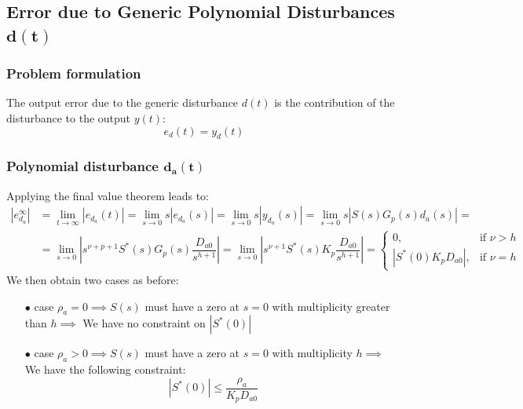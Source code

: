 \documentclass{article}
\numberwithin{equation}{subsection}
\begin{document}
	\subsection{Error due to Generic Polynomial Disturbances $\boldsymbol{d(t)}$}
	\subsubsection{Problem formulation}
	The output error due to the generic disturbance $d(t)$ is the contribution of the disturbance to the output $y(t)$:
	\begin{equation}
		e_d(t) = y_d(t)
	\end{equation}
	
	\subsubsection{Polynomial disturbance $\boldsymbol{d_a(t)}$}
	Applying the final value theorem leads to:
	\begin{align}
		\left| e_{d_a}^\infty \right| &= \displaystyle\lim_{t\to\infty} 	\left|e_{d_a}(t)\right| = \displaystyle\lim_{s\to0}s \left|e_{d_a}(s)\right| = \displaystyle\lim_{s\to0}s \left|y_{d_a}(s)\right| = \displaystyle\lim_{s\to0}s \left| S(s)G_p(s)d_a(s) \right| = \nonumber \\
		&= \displaystyle\lim_{s\to0} 	\left|s^{\nu+p+1}S^*(s)G_p(s)\dfrac{D_{a0}}{s^{h+1}}\right| = \displaystyle\lim_{s\to0} \left|s^{\nu+1}S^*(s)K_p\dfrac{D_{a0}}{s^{h+1}}\right| =
		\begin{cases}
			0, & \text{if } \nu>h \\
			\left|S^*(0)K_pD_{a0}\right|, & \text{if } \nu = h
		\end{cases}
	\end{align}
	We then obtain two cases as before:
	\begin{enumerate}
		\item[$\bullet$] case $\rho_a=0 \implies S(s)$ must have a zero at $s=0$ with multiplicity greater than $h \implies$ We have no constraint on $\left|S^*(0)\right| $ 
		\item[$\bullet$] case $\rho_a>0 \implies S(s)$ must have a zero at $s=0$ with multiplicity $h \implies$ We have the following constraint:
		\begin{equation}
			\left|S^*(0)\right| \leq \dfrac{\rho_a}{K_pD_{a0}}	
		\end{equation}
	\end{enumerate}
	
\end{document}
